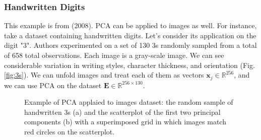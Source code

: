 \subsubsection{Handwritten Digits}
This example is  from \citeauthor{tibshirani_elements_2008} (2008).
PCA can be applied to images as well. For instance, take a dataset containing handwritten digits. Let's consider its application on the digit "3". Authors experimented on a set of 130 3s randomly sampled from a total of 658 total observations. Each image is a  gray-scale image. We can see considerable variation in writing styles, character thickness, and orientation (Fig. \ref{fig:3s}). We can unfold images and treat each of them as vectors $\textbf{x}_j \in \mathbb{R}^{256}$, and we can use PCA on the dataset $\mathbf{E}\in\mathbb{R}^{256\times 130}$.
\begin{figure}
    \centering
    \qquad
    \caption[Example of PCA of images.]{Example of PCA applaied to images dataset: the random sample of handwritten 3s (a) and the scatterplot of the first two principal components (b) with a superimposed grid in which images match red circles on the scatterplot\cite{tibshirani_elements_2008}.}
\end{figure}
